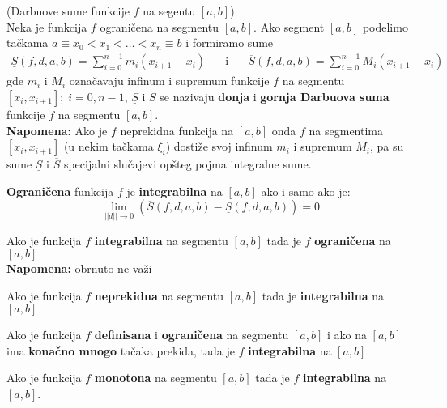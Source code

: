 \begin{definition}
	(Darbuove sume funkcije $f$ na segentu $[a,b]$)\\
	Neka je funkcija $f$ ograničena na segmentu $[a,b]$. Ako segment $[a,b]$ podelimo tačkama $a \equiv x_0 < x_1 < \ldots < x_n \equiv b$ i formiramo sume 
	$$\begin{aligned}
		\underline{S}(f,d,a,b) = \sum^{n-1}_{i=0} m_i(x_{i+1}-x_i)
	\end{aligned}
	\quad \text{ i } \quad
	\begin{aligned}
		\overline{S}(f,d,a,b) = \sum^{n-1}_{i=0} M_i(x_{i+1}-x_i)
	\end{aligned}$$
	gde $m_i$ i $M_i$ označavaju infinum i supremum funkcije $f$ na segmentu $[x_i,x_{i+1}]; \; i=\overline{0, n-1}$, $\underline{S}$ i $\overline{S}$ se nazivaju \textbf{donja} i \textbf{gornja Darbuova suma} funkcije $f$ na segmentu $[a,b]$.\\
	\textbf{Napomena:} Ako je $f$ neprekidna funkcija na $[a,b]$ onda $f$ na segmentima $[x_i,x_{i+1}]$ (u nekim tačkama $\xi_i$) dostiže svoj infinum $m_i$ i supremum $M_i$, pa su sume $\underline{S}$ i $\overline{S}$ specijalni slučajevi opšteg pojma integralne sume.
\end{definition}
\begin{theorem}
	\textbf{Ograničena} funkcija $f$ je \textbf{integrabilna} na $[a,b]$ ako i samo ako je: $$\lim_{||d||\to 0} \left(\overline{S}(f,d,a,b) - \underline{S}(f,d,a,b)\right) = 0$$
\end{theorem}
\begin{theorem}
	Ako je funkcija $f$ \textbf{integrabilna} na segmentu $[a,b]$ tada je $f$ \textbf{ograničena} na $[a,b]$ \\
	\textbf{Napomena:} obrnuto ne važi
\end{theorem}
\begin{theorem}
	Ako je funkcija $f$ \textbf{neprekidna} na segmentu $[a,b]$ tada je \textbf{integrabilna} na $[a,b]$
\end{theorem}
\begin{theorem}
	Ako je funkcija $f$ \textbf{definisana} i  \textbf{ograničena} na segmentu $[a,b]$ i ako na $[a,b]$ ima \textbf{konačno mnogo} tačaka prekida, tada je $f$ \textbf{integrabilna} na $[a,b]$
\end{theorem}
\begin{theorem}
	Ako je funkcija $f$ \textbf{monotona} na segmentu $[a,b]$ tada je $f$ \textbf{integrabilna} na $[a,b]$.
\end{theorem}


